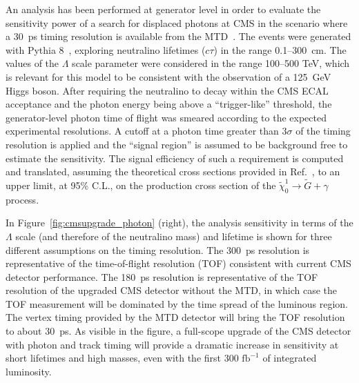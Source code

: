 An analysis has been performed at generator level in order to evaluate the sensitivity power of a search for displaced photons at CMS in the scenario where a 30~ps timing resolution is available from the MTD~\cite{MTD_TP}. The events were generated with Pythia 8~\cite{Sjostrand:2007gs}, exploring neutralino lifetimes ($c\tau$) in the range 0.1--300~cm. The values of the $\Lambda$ scale parameter were considered in the range 100--500 TeV, which is relevant for this model to be consistent with the observation of a 125~GeV Higgs boson. After requiring the neutralino to decay within the CMS ECAL acceptance and the photon energy being above a ``trigger-like'' threshold, the generator-level photon time of flight was smeared according to the expected experimental resolutions. A cutoff at a photon time greater than 3$\sigma$ of the timing resolution is applied and the ``signal region'' is assumed to be background free to estimate the sensitivity. The signal efficiency of such a requirement is computed and translated, assuming the theoretical cross sections provided in Ref.~\cite{Strassler:2006im}, to an upper limit, at 95\% C.L., on the production cross section of the $\tilde{\chi}_0^1 \to \tilde{G} + \gamma$ process.

In Figure~\ref{fig:cmsupgrade_photon} (right), the analysis sensitivity in terms of the $\Lambda$ scale (and therefore of the neutralino mass) and lifetime is shown for three different assumptions on the timing resolution. The 300~ps resolution is representative of the time-of-flight resolution (TOF) consistent with current CMS detector performance. The 180~ps resolution is representative of the TOF resolution of the upgraded CMS detector without the MTD, in which case the TOF measurement will be dominated by the time spread of the luminous region. The vertex timing provided by the MTD detector will bring the TOF resolution to about 30~ps. As visible in the figure, a full-scope upgrade of the CMS detector with photon and track timing will provide a dramatic increase in sensitivity at short lifetimes and high masses, even with the first $300\,\,\mathrm{fb}^{-1}$ of integrated luminosity.

